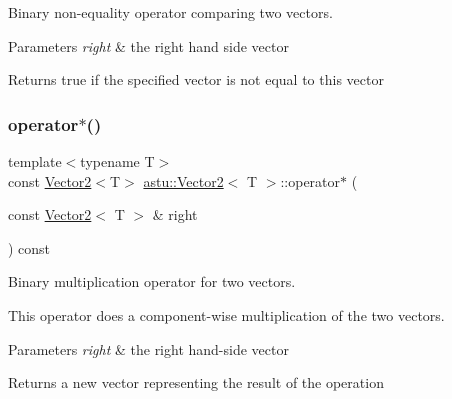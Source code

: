 Binary non-\/equality operator comparing two vectors.


\begin{DoxyParams}{Parameters}
{\em right} & the right hand side vector \\
\hline
\end{DoxyParams}
\begin{DoxyReturn}{Returns}
{\ttfamily true} if the specified vector is not equal to this vector 
\end{DoxyReturn}
\mbox{\label{classastu_1_1Vector2_a5ee8479488e6da2a82110f2ac62d386f}} 
\subsubsection{\texorpdfstring{operator$\ast$()}{operator*()}\hspace{0.1cm}{\footnotesize\ttfamily [1/2]}}
{\footnotesize\ttfamily template$<$typename T$>$ \\
const \hyperlink{classastu_1_1Vector2}{Vector2}$<$T$>$ \hyperlink{classastu_1_1Vector2}{astu\+::\+Vector2}$<$ T $>$\+::operator$\ast$ (\begin{DoxyParamCaption}\item[{const \hyperlink{classastu_1_1Vector2}{Vector2}$<$ T $>$ \&}]{right }\end{DoxyParamCaption}) const\hspace{0.3cm}{\ttfamily [inline]}}

Binary multiplication operator for two vectors.

This operator does a component-\/wise multiplication of the two vectors.


\begin{DoxyParams}{Parameters}
{\em right} & the right hand-\/side vector \\
\hline
\end{DoxyParams}
\begin{DoxyReturn}{Returns}
a new vector representing the result of the operation 
\end{DoxyReturn}
\mbox{\label{classastu_1_1Vector2_aa9cd4d74e0174cb0995613f989e42f12}} 
